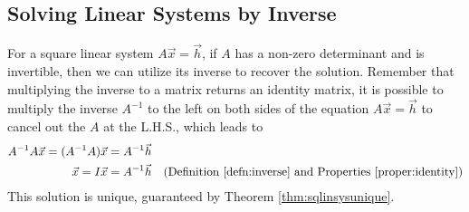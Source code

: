 \subsection{Solving Linear Systems by Inverse}
\label{subsection:SolLinSysInv}
For a square linear system $A\vec{x} = \vec{h}$, if $A$ has a non-zero determinant and is invertible, then we can utilize its inverse to recover the solution. Remember that multiplying the inverse to a matrix returns an identity matrix, it is possible to multiply the inverse $A^{-1}$ to the left on both sides of the equation $A\vec{x} = \vec{h}$ to cancel out the $A$ at the L.H.S., which leads to
\begin{align*}
A^{-1}A\vec{x}= (A^{-1}A)\vec{x} &= A^{-1}\vec{h} \\
\vec{x} = I\vec{x} &= A^{-1}\vec{h} &\text{(Definition \ref{defn:inverse} and Properties \ref{proper:identity})}
\end{align*}
This solution is unique, guaranteed by Theorem \ref{thm:sqlinsysunique}.
